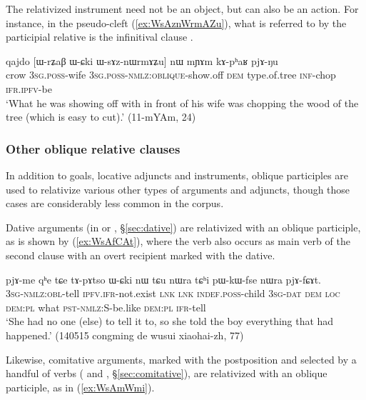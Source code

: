 The relativized instrument need not be an object, but can also be an action. For instance, in the pseudo-cleft (\ref{ex:WsAznWrmAZu}), what is referred to by the participial relative is the infinitival clause .

\begin{exe}
\ex \label{ex:WsAznWrmAZu}
\gll qajdo [ɯ-rʑaβ ɯ-ɕki ɯ-sɤz-nɯrmɤʑu] nɯ mɲɤm kɤ-pʰaʁ pjɤ-ŋu  \\
crow \textsc{3sg}.\textsc{poss}-wife \textsc{3sg}.\textsc{poss}-\textsc{nmlz}:\textsc{oblique}-show.off \textsc{dem} type.of.tree \textsc{inf}-chop \textsc{ifr}.\textsc{ipfv}-be \\
\glt  `What he was showing off with in front of his wife was chopping the wood of the  tree (which is easy to cut).' (11-mYAm, 24)
\end{exe}


\subsubsection{Other oblique relative clauses} \label{sec:other.oblique.participle.relatives}
In addition to goals, locative adjuncts and instruments, oblique participles are used to relativize various other types of arguments and adjuncts, though those cases are considerably less common in the corpus.

Dative arguments (in  or , §\ref{sec:dative}) are relativized with an oblique participle, as is shown by (\ref{ex:WsAfCAt}),  where the verb  also occurs as main verb of the second clause with an overt recipient marked with the dative.

\begin{exe}
\ex \label{ex:WsAfCAt}
\gll [ɯ-sɤ-fɕɤt] pjɤ-me qʰe tɕe tɤ-pɤtso ɯ-ɕki nɯ tɕu nɯra tɕʰi pɯ-kɯ-fse nɯra pjɤ-fɕɤt. \\
\textsc{3sg-nmlz:obl}-tell \textsc{ipfv.ifr}-not.exist \textsc{lnk} \textsc{lnk} \textsc{indef.poss}-child \textsc{3sg-dat} \textsc{dem} \textsc{loc} \textsc{dem:pl} what \textsc{pst-nmlz:S}-be.like  \textsc{dem:pl} \textsc{ifr}-tell \\
\glt `She had no one (else) to tell it to, so she told the boy everything that had happened.' (140515 congming de wusui xiaohai-zh, 77)
\end{exe} 

Likewise, comitative arguments, marked with the postposition  and selected by a handful of verbs ( and  , §\ref{sec:comitative}), are relativized with an oblique participle, as in (\ref{ex:WsAmWmi}).

